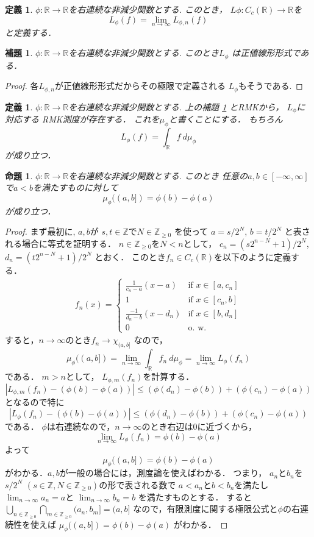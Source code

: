 \documentclass[leqno, a4paper, 12pt]{jsarticle}
\newtheorem{prop}[thm]{命題}
\newtheorem{lem}[thm]{補題}
\newtheorem{df}[thm]{定義}
\newcommand{\zz}{\mathbb{Z}}
\newcommand{\rr}{\mathbb{R}}
\begin{document}
\begin{df}
$\phi:\rr\to \rr$を右連続な非減少関数とする.
このとき，
$L{\phi}: C_c(\rr)\to \rr$を
\[
L_{\phi}(f)=\lim_{n\to \infty}L_{\phi, n}(f)
\]
と定義する．
\end{df}


\begin{lem}\label{lem:senkei}
$\phi:\rr\to \rr$を右連続な非減少関数とする.
このとき$L_{\phi}$
は正値線形形式である．
\end{lem}
\begin{proof}
各$L_{\phi, n}$が正値線形形式だからその極限で定義される
$L_{\phi}$もそうである.

\end{proof}

\begin{df}
$\phi:\rr\to \rr$を右連続な非減少関数とする.
上の補題 \ref{lem:senkei} とRMKから，
$L_{\phi}$に対応する
RMK測度が存在する．
これを$\mu_{\phi}$と書くことにする．
もちろん
\[
L_{\phi}(f)=\int_{\rr}f \ d\mu_{\phi}
\]
が成り立つ．
\end{df}


\begin{prop}
$\phi:\rr\to \rr$を右連続な非減少関数とする.
このとき
任意の$a, b\in [-\infty, \infty]$で$a<b$を満たすものに対して
\[
\mu_{\phi}((a, b])=\phi(b)-\phi(a)
\]
が成り立つ．
\end{prop}
\begin{proof}
まず最初に, $a, b$が
$s, t\in \zz$で$N\in \zz_{\ge 0}$
を使って
$a=s/2^N$, 
$b=t/2^N$
と表される場合に等式を証明する．
$n\in \zz_{\ge 0}$を$N<n$として，
$c_n=(s2^{n-N}+1)/2^N$, 
$d_n=(t2^{n-N}+1)/2^N$
とおく．
このとき$f_n\in C_c(\rr)$を以下のように定義する．
\begin{align*}
f_n(x)=
\begin{cases}
\frac{1}{c_n-a}(x-a) & \text{if $x\in [a, c_n]$}\\
1 & \text{if $x\in [c_n, b]$}\\
\frac{-1}{d_n-b}(x-d_n) & \text{if $x\in [b, d_n]$}\\
0 & \text{o. w. }
\end{cases}
\end{align*}
すると，$n\to \infty$のとき$f_n\to \chi_{(a, b]}$
なので，
\[
\mu_{\phi}((a, b])=\lim_{n\to \infty}\int_{\rr}f_n\ d\mu_{\phi}
=
\lim_{n\to \infty}L_{\phi}(f_n)
\]
である．
$m>n$として，
$L_{\phi, m}(f_n)$を計算する．
\[
|L_{\phi, m}(f_n)-(\phi(b)-\phi(a))|\le (\phi(d_n)-\phi(b))+(\phi(c_n)-\phi(a))
\]
となるので特に
\[
|L_{\phi}(f_n)-(\phi(b)-\phi(a))|\le (\phi(d_n)-\phi(b))+(\phi(c_n)-\phi(a))
\]
である．
$\phi$は右連続なので，$n\to \infty$のとき右辺は$0$に近づくから，
\[
\lim_{n\to \infty}L_{\phi}(f_n)=\phi(b)-\phi(a)
\]
よって
\[
\mu_{\phi}((a, b])=\phi(b)-\phi(a)
\]
がわかる．$a, b$が一般の場合には，測度論を使えばわかる．
つまり，
$a_{n}$と$b_{n}$を$s/2^{N}$ $(s\in \zz, N\in \zz_{\ge 0})$の形で表される数で
$a<a_{n}$と$b<b_{n}$を満たし
$\lim_{n\to \infty}a_{n}=a$と
$\lim_{n\to \infty}b_{n}=b$
を満たすものとする．
すると
$\bigcup_{n\in \zz_{\ge 0}}\bigcap_{m\in \zz_{\ge 0}}(a_{n}, b_{m}]=(a, b]$
なので，有限測度に関する極限公式と$\phi$の右連続性を使えば
$\mu_{\phi}((a, b])=\phi(b)-\phi(a)$
がわかる．
\end{proof}
\end{document}
